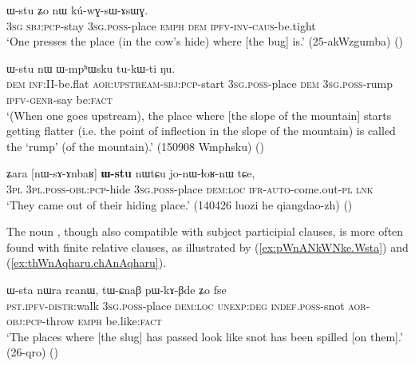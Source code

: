 \begin{exe}
\ex \label{ex:kWrAZi.Wstu}
  ɯ-stu ʑo nɯ kú-wɣ-sɯ-ɤsɯɣ. \\
\textsc{3sg} \textsc{sbj}:\textsc{pcp}-stay \textsc{3sg}.\textsc{poss}-place \textsc{emph} \textsc{dem} \textsc{ipfv}-\textsc{inv}-\textsc{caus}-be.tight \\
\glt `One presses the place (in the cow's hide) where [the bug] is.' (25-akWzgumba)
()
\end{exe}

\begin{exe}
\ex \label{ex:tAntAm.lAkWZa.Wstu}
  ɯ-stu nɯ ɯ-mpʰɯsku tu-kɯ-ti ŋu. \\
\textsc{dem} \textsc{inf}:II-be.flat \textsc{aor}:\textsc{upstream}-\textsc{sbj}:\textsc{pcp}-start \textsc{3sg}.\textsc{poss}-place \textsc{dem} \textsc{3sg}.\textsc{poss}-rump \textsc{ipfv}-\textsc{genr}-say be:\textsc{fact} \\
\glt  `(When one goes upstream), the place where [the slope of the mountain] starts getting flatter (i.e. the point of inflection in the slope of the mountain) is called  the `rump' (of the mountain).' (150908 Wmphsku)
()
\end{exe}
 
\begin{exe}
\ex \label{ex:nWsAnbaR.Wstu}
 \gll ʑara [nɯ-sɤ-ɤnbaʁ] \textbf{ɯ-stu} nɯtɕu jo-nɯ-ɬoʁ-nɯ tɕe, \\
 \textsc{3pl} \textsc{3pl}.\textsc{poss}-\textsc{obl}:\textsc{pcp}-hide \textsc{3sg}.\textsc{poss}-place \textsc{dem}:\textsc{loc} \textsc{ifr}-\textsc{auto}-come.out-\textsc{pl} \textsc{lnk} \\
 \glt `They came out of their hiding place.' (140426 luozi he qiangdao-zh)
 ()
\end{exe}

The noun , though also compatible with subject participial clauses, is more often found with finite relative clauses, as illustrated by  (\ref{ex:pWnANkWNke.Wsta}) and (\ref{ex:thWnAqharu.chAnAqharu}).  

\begin{exe}
\ex \label{ex:pWnANkWNke.Wsta}
 \gll  [pɯ-nɤŋkɯŋke] ɯ-sta nɯra rcanɯ, tɯ-ɕnaβ pɯ-kɤ-βde ʑo fse \\
 \textsc{pst}.\textsc{ipfv}-\textsc{distr}:walk \textsc{3sg}.\textsc{poss}-place \textsc{dem}:\textsc{loc} \textsc{unexp}:\textsc{deg} \textsc{indef}.\textsc{poss}-snot \textsc{aor}-\textsc{obj}:\textsc{pcp}-throw \textsc{emph} be.like:\textsc{fact} \\
 \glt `The places where [the slug] has passed look like snot has been spilled  [on them].' (26-qro)
 ()
 \end{exe}

